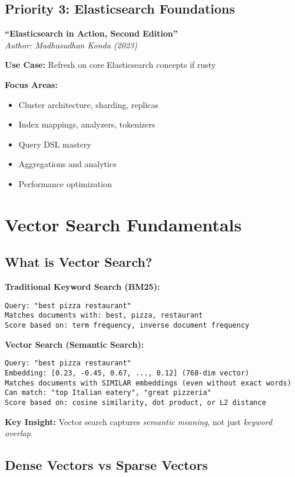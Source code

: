 \documentclass[10pt]{article}
\begin{document}
\subsection{Priority 3: Elasticsearch Foundations}

\textbf{``Elasticsearch in Action, Second Edition''} \\
\textit{Author: Madhusudhan Konda (2023)}

\textbf{Use Case:} Refresh on core Elasticsearch concepts if rusty

\textbf{Focus Areas:}
\begin{itemize}
\item Cluster architecture, sharding, replicas
\item Index mappings, analyzers, tokenizers
\item Query DSL mastery
\item Aggregations and analytics
\item Performance optimization
\end{itemize}

\section{Vector Search Fundamentals}

\subsection{What is Vector Search?}

\textbf{Traditional Keyword Search (BM25):}
\begin{verbatim}
Query: "best pizza restaurant"
Matches documents with: best, pizza, restaurant
Score based on: term frequency, inverse document frequency
\end{verbatim}

\textbf{Vector Search (Semantic Search):}
\begin{verbatim}
Query: "best pizza restaurant"
Embedding: [0.23, -0.45, 0.67, ..., 0.12] (768-dim vector)
Matches documents with SIMILAR embeddings (even without exact words)
Can match: "top Italian eatery", "great pizzeria"
Score based on: cosine similarity, dot product, or L2 distance
\end{verbatim}

\textbf{Key Insight:} Vector search captures \textit{semantic meaning}, not just \textit{keyword overlap}.

\subsection{Dense Vectors vs Sparse Vectors}
\end{document}
